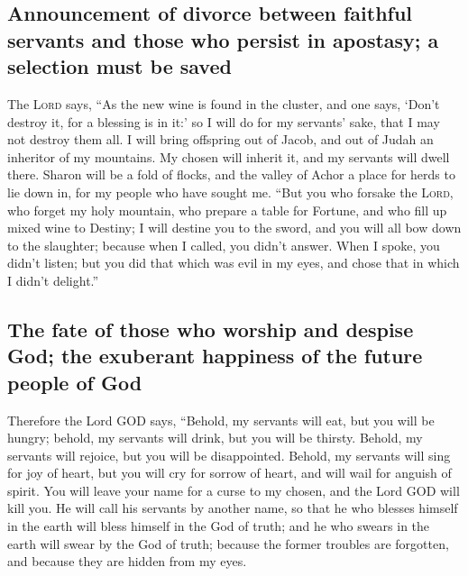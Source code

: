 \hypertarget{announcement-of-divorce-between-faithful-servants-and-those-who-persist-in-apostasy-a-selection-must-be-saved}{%
\subsection{Announcement of divorce between faithful servants and those
who persist in apostasy; a selection must be
saved}\label{announcement-of-divorce-between-faithful-servants-and-those-who-persist-in-apostasy-a-selection-must-be-saved}}

 The \textsc{Lord} says, ``As the new wine is found in the
cluster, and one says, `Don't destroy it, for a blessing is in it:' so I
will do for my servants' sake, that I may not destroy them all.
 I will bring offspring out of Jacob, and out of Judah an
inheritor of my mountains. My chosen will inherit it, and my servants
will dwell there.  Sharon will be a fold of flocks, and
the valley of Achor a place for herds to lie down in, for my people who
have sought me.  ``But you who forsake the \textsc{Lord},
who forget my holy mountain, who prepare a table for Fortune, and who
fill up mixed wine to Destiny;  I will destine you to the
sword, and you will all bow down to the slaughter; because when I
called, you didn't answer. When I spoke, you didn't listen; but you did
that which was evil in my eyes, and chose that in which I didn't
delight.''

\hypertarget{the-fate-of-those-who-worship-and-despise-god-the-exuberant-happiness-of-the-future-people-of-god}{%
\subsection{The fate of those who worship and despise God; the exuberant
happiness of the future people of
God}\label{the-fate-of-those-who-worship-and-despise-god-the-exuberant-happiness-of-the-future-people-of-god}}

 Therefore the Lord GOD says, ``Behold, my servants will
eat, but you will be hungry; behold, my servants will drink, but you
will be thirsty. Behold, my servants will rejoice, but you will be
disappointed.  Behold, my servants will sing for joy of
heart, but you will cry for sorrow of heart, and will wail for anguish
of spirit.  You will leave your name for a curse to my
chosen, and the Lord GOD will kill you. He will call his servants by
another name,  so that he who blesses himself in the
earth will bless himself in the God of truth; and he who swears in the
earth will swear by the God of truth; because the former troubles are
forgotten, and because they are hidden from my eyes.

